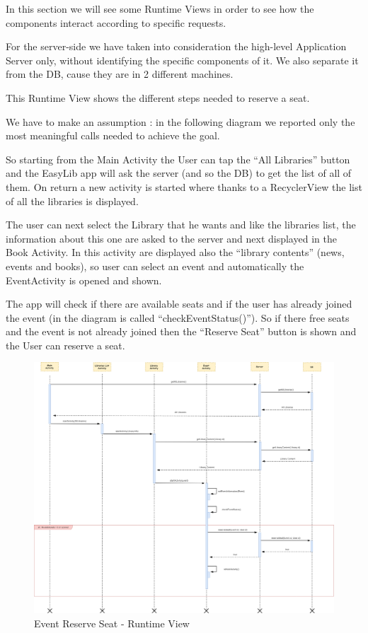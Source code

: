 \vspace*{-5mm}
In this section we will see some Runtime Views in order to see how the components interact according to specific requests.\par
For the server-side we have taken into consideration the high-level Application Server only, without identifying the specific components of it. We also separate it from the DB, cause they are in 2 different machines.

This Runtime View shows the different steps needed to reserve a seat. \par
We have to make an assumption : in the following diagram we reported only the most meaningful calls needed to achieve the goal. \par
So starting from the Main Activity the User can tap the “All Libraries” button and the EasyLib app will ask the server (and so the DB) to get the list of all of them. On return a new activity is started where thanks to a RecyclerView the list of all the libraries is displayed. \par
The user can next select the Library that he wants and like the libraries list, the information about this one are asked to the server and next displayed in the Book Activity. In this activity are displayed also the “library contents” (news, events and books), so user can select an event and automatically the EventActivity is opened and shown.\par
The app will check if there are available seats and if the user has already joined the event (in the diagram is called “checkEventStatus()”). So if there free seats and the event is not already joined then the “Reserve Seat” button is shown and the User can reserve a seat.
\newpage
\vspace*{0cm}
\begin{figure}[H]
	\centering
	\includegraphics[scale=0.22]{Images/Runtime/event_reserve_seat}
	\caption{Event Reserve Seat - Runtime View}
\end{figure}